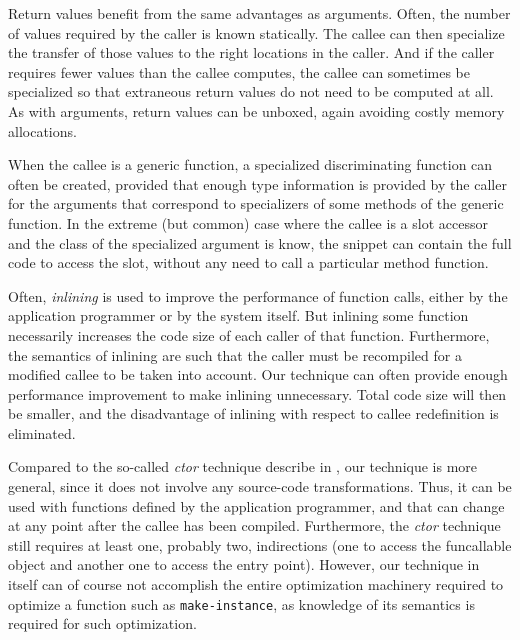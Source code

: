 Return values benefit from the same advantages as arguments.  Often,
the number of values required by the caller is known statically.  The
callee can then specialize the transfer of those values to the right
locations in the caller.  And if the caller requires fewer values than
the callee computes, the callee can sometimes be specialized so that
extraneous return values do not need to be computed at all.  As with
arguments, return values can be unboxed, again avoiding costly memory
allocations.

When the callee is a generic function, a specialized discriminating
function can often be created, provided that enough type information
is provided by the caller for the arguments that correspond to
specializers of some methods of the generic function.  In the extreme
(but common) case where the callee is a slot accessor and the class of
the specialized argument is know, the snippet can contain the full
code to access the slot, without any need to call a particular method
function.

Often, \emph{inlining} is used to improve the performance of function
calls, either by the application programmer or by the system itself.
But inlining some function necessarily increases the code size of each
caller of that function.  Furthermore, the semantics of inlining are
such that the caller must be recompiled for a modified callee to be
taken into account.  Our technique can often provide enough
performance improvement to make inlining unnecessary.  Total code size
will then be smaller, and the disadvantage of inlining with respect to
callee redefinition is eliminated.

Compared to the so-called \emph{ctor} technique describe in
, our technique is more general, since it
does not involve any source-code transformations.  Thus, it can be
used with functions defined by the application programmer, and that
can change at any point after the callee has been compiled.
Furthermore, the \emph{ctor} technique still requires at least one,
probably two, indirections (one to access the funcallable object and
another one to access the entry point).  However, our technique in
itself can of course not accomplish the entire optimization machinery
required to optimize a function such as \texttt{make-instance}, as
knowledge of its semantics is required for such optimization.

